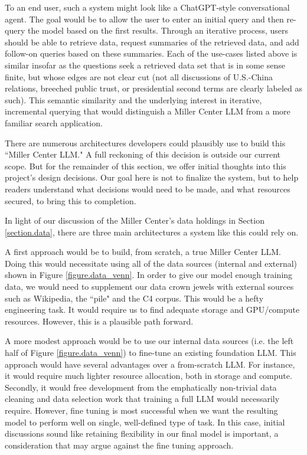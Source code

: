 \documentclass[12pt, oneside]{article}   	%
\begin{document}
To an end user, such a system might look like a ChatGPT-style conversational agent.  The goal would be to allow the user to enter an initial query and then re-query the model based on the first results.  Through an iterative process, users should be able to retrieve data, request  summaries of the retrieved data, and add follow-on queries based on these summaries.  Each of the use-cases listed above is similar insofar as the questions seek a retrieved data set that is in some sense finite, but whose edges are not clear cut (not all discussions of U.S.-China relations, breeched public trust, or presidential second terms are clearly labeled as such).  This semantic similarity and the underlying interest in iterative, incremental querying that would distinguish a Miller Center LLM from a more familiar search application.

There are numerous architectures developers could plausibly use to build this ``Miller Center LLM."  A full reckoning of this decision is outside our current scope.  But for the remainder of this section, we offer initial thoughts into this project's design decisions.  Our goal here is not to finalize the system, but to help readers understand what decisions would need to be made, and what resources secured, to bring this to completion.

In light of our discussion of the Miller Center's data holdings in Section \ref{section.data}, there are three main architectures a system like this could rely on.

A first approach would be to build, from scratch, a true Miller Center LLM.  Doing this would necessitate using all of the data sources (internal and external) shown in Figure \ref{figure.data_venn}.  In order to give our model enough training data, we would need to supplement our data crown jewels with external sources such as Wikipedia, the ``pile" and the C4 corpus.  This would be a hefty engineering task.  It would require us to find adequate storage and GPU/compute resources.  However, this is a plausible path forward.

A more modest approach would be to use our internal data sources (i.e. the left half of Figure \ref{figure.data_venn}) to fine-tune an existing foundation LLM.  This approach would have several advantages over a from-scratch LLM.  For instance, it would require much lighter resource allocation, both in storage and compute.  Secondly, it would free development from the emphatically non-trivial data cleaning and data selection work that training a full LLM would necessarily require.  However, fine tuning is most successful when we want the resulting model to perform well on single, well-defined type of task.  In this case, initial discussions sound like retaining flexibility in our final model is important, a consideration that may argue against the fine tuning approach.
\end{document}

